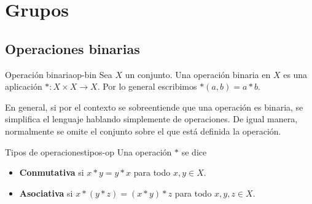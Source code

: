 \chapter{Grupos}

\section{Operaciones binarias}

\begin{definition}{Operación binaria}{op-bin}
    Sea \(X\) un conjunto. Una operación binaria en \(X\) es una aplicación \(*:X\times X\to X\). Por lo general escribimos \( * (a,b) = a * b\).
\end{definition}

\begin{remark}
    En general, si por el contexto se sobreentiende que una operación es binaria, se simplifica el lenguaje hablando simplemente de operaciones. De igual manera, normalmente se omite el conjunto sobre el que está definida la operación.
\end{remark}

\begin{definition}{Tipos de operaciones}{tipos-op}
    Una operación $*$ se dice
    \begin{itemize}
        \item \textbf{Conmutativa} si $x * y = y * x$ para todo $x,y\in X$.
        \item \textbf{Asociativa} si $x * (y * z) = (x * y) * z$ para todo $x,y,z \in X$.
    \end{itemize}
\end{definition}

